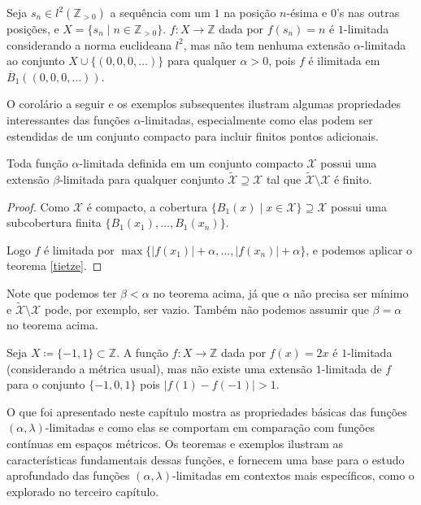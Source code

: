 

\begin{example}
  Seja $s_n \in l^2(\mathbb{Z}_{> 0})$ a sequência com um $1$ na posição $n$-ésima e $0$'s nas outras posições, e $X = \{ s_n \mid n \in \mathbb{Z}_{> 0} \}$. $f \colon X \to \mathbb{Z}$ dada por $f(s_n) = n$ é $1$-limitada considerando a norma euclideana $l^2$, mas não tem nenhuma extensão $\alpha$-limitada ao conjunto $X \cup \{(0, 0, 0, \dots)\}$ para qualquer $\alpha > 0$, pois $f$ é ilimitada em $\overline{B}_1((0, 0, 0, \dots))$.
\end{example}



O corolário a seguir e os exemplos subsequentes ilustram algumas propriedades interessantes das funções $\alpha$-limitadas, especialmente como elas podem ser estendidas de um conjunto compacto para incluir finitos pontos adicionais.

\begin{corollary}
  Toda função $\alpha$-limitada definida em um conjunto compacto $\mathcal{X}$ possui uma extensão $\beta$-limitada para qualquer conjunto $\tilde{\mathcal{X}} \supseteq \mathcal{X}$ tal que $\tilde{\mathcal{X}} \setminus \mathcal{X}$ é finito.
\end{corollary}
\begin{proof}
  Como $\mathcal{X}$ é compacto, a cobertura $\{ B_1(x) \mid x \in \mathcal{X} \} \supseteq \mathcal{X}$ possui uma subcobertura finita $\{ B_1(x_1), \dots, B_1(x_n)\}$.

  Logo $f$ é limitada por $\max\{\lvert f(x_1) \rvert + \alpha, \dots, \lvert f(x_n) \rvert + \alpha\}$, e podemos aplicar o teorema \ref{tietze}.
\end{proof}

Note que podemos ter $\beta < \alpha$ no teorema acima, já que $\alpha$ não precisa ser mínimo e $\tilde{\mathcal{X}} \setminus \mathcal{X}$ pode, por exemplo, ser vazio. Também não podemos assumir que $\beta = \alpha$ no teorema acima.

\begin{example}
  Seja $X \coloneqq \{-1, 1\} \subset \mathbb{Z}$. A função $f \colon X \to \mathbb{Z}$ dada por $f(x) = 2x$ é $1$-limitada (considerando a métrica usual), mas não existe uma extensão $1$-limitada de $f$ para o conjunto $\{-1, 0, 1\}$ pois $\lvert f(1) - f(-1) \rvert > 1$.
\end{example}

O que foi apresentado neste capítulo mostra as propriedades básicas das funções $(\alpha,\lambda)$-limitadas e como elas se comportam em comparação com funções contínuas em espaços métricos. Os teoremas e exemplos ilustram as características fundamentais dessas funções, e fornecem uma base para o estudo aprofundado das funções $(\alpha,\lambda)$-limitadas em contextos mais específicos, como o explorado no terceiro capítulo.
